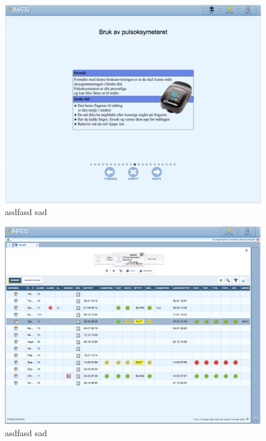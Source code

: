 \begin{figure}
\includegraphics[width=1.0\textwidth,center]{fig/helsami/tk_9_brukerveil_puls}
\caption{asdfasd sad}
\label{fig:helsami1}
\end{figure}

\begin{figure}
\includegraphics[width=1.0\textwidth,center]{fig/helsami/tk_10_oversikt}
\caption{asdfasd sad}
\label{fig:helsami1}
\end{figure}

